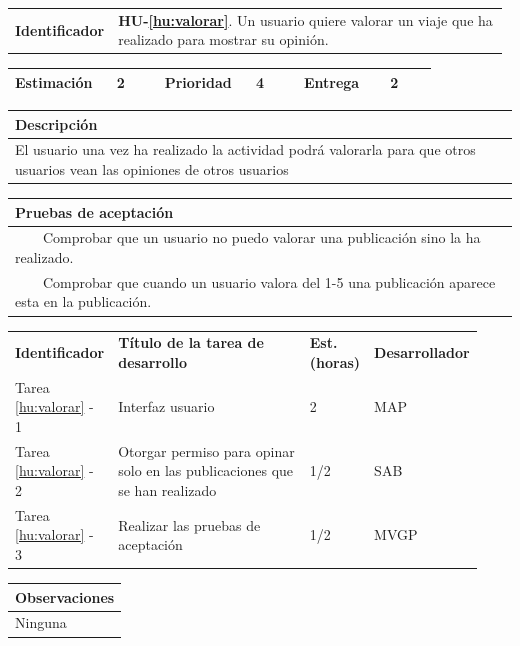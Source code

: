 \documentclass[11pt]{article}
\newcommand{\tabitem}{~~\llap{\textbullet}~~}
\begin{document}
\begin{longtable}{p{0.18\linewidth}|p{0.8\linewidth}}
  \rowcolor{LightCyan}
  \textbf{Identificador} & \textbf{HU-\ref{hu:valorar}}. Un usuario quiere valorar un viaje que ha realizado para mostrar su opinión. \\  
\end{longtable}
\vspace{-0.8cm}
\begin{longtable}{p{0.18\linewidth}|p{0.1\linewidth}|p{0.18\linewidth}|p{0.1\linewidth}|p{0.18\linewidth}|p{0.1\linewidth}}
  \toprule
  \textbf{Estimación} & 2 & \textbf{Prioridad} & 4 & \textbf{Entrega} & 2 \\
  \bottomrule
\end{longtable}
\vspace{-0.8cm}
\begin{longtable}{p{1.028\linewidth}}
  \textbf{Descripción}\\
  \midrule
  El usuario una vez ha realizado la actividad podrá valorarla para que otros usuarios vean las opiniones de otros usuarios
 \\
  \bottomrule
\end{longtable}
\vspace{-0.8cm}
\begin{longtable}{p{1.028\linewidth}}
  \textbf{Pruebas de aceptación}\\
  \midrule
  \tabitem Comprobar que un usuario no puedo valorar una publicación sino la ha realizado.\\
  \tabitem Comprobar que cuando un usuario valora del 1-5 una publicación aparece esta en la publicación.\\
\end{longtable}
\vspace{-0.8cm}
\begin{longtable}{p{0.18\linewidth}|p{0.48\linewidth}|p{0.1\linewidth}|p{0.17\linewidth}}
  \toprule
  \textbf{Identificador} & \textbf{Título de la tarea de desarrollo} & \textbf{Est. (horas)} & \textbf{Desarrollador} \\
  Tarea \ref{hu:valorar} - 1 & Interfaz usuario & 2 & MAP\\
  Tarea \ref{hu:valorar} - 2 &  Otorgar permiso para opinar solo en las publicaciones que se han realizado & 1/2 & SAB\\
  Tarea \ref{hu:valorar} - 3 & Realizar las pruebas de aceptación & 1/2 & MVGP\\
  \bottomrule
\end{longtable}
\vspace{-0.8cm}
\begin{longtable}{p{1.028\linewidth}}
  \textbf{Observaciones}\\
  \midrule
  Ninguna\\
  \bottomrule
\end{longtable}
\end{document}
